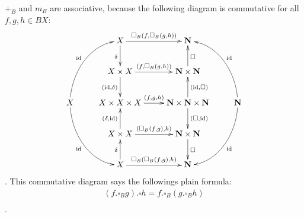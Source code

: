 $+_B$ and $m_B$ are associative, because the following diagram is commutative
for all $f,g,h\in BX$:
\begin{equation}\xymatrix{
	& X \ar[r]^{\square_B\kakko{f,\square_B\kakko{g, h}}} \ar[d]_{\delta} 
	& \mybf{N}
	\\
	& X\times X \ar[r]^{\kakko{f,\square_B\kakko{g, h}}} \ar[d]_{(\myid,\delta)}
	& \mybf{N}\times \mybf{N} \ar[u]_{\square}
	\\
	X \ar@(u,l)[ruu]^{\myid} \ar@(d,l)[rdd]_{\myid}
	& X\times X\times X \ar[r]^{(f, g, h)}
	& \mybf{N}\times \mybf{N}\times \mybf{N} \ar[d]^{(\square, \myid)} \ar[u]_{(\myid, \square)}
	& \mybf{N} \ar@(u,r)[luu]_{\myid} \ar@(d,r)[ldd]^{\myid}
	\\
	& X\times X \ar[r]^{\kakko{\square_B\kakko{f, g},h}} \ar[u]^{(\delta,\myid)}
	& \mybf{N}\times \mybf{N} \ar[d]^{\square}
	\\
	& X \ar[r]^{\square_B\kakko{\square_B\kakko{f, g},h}} \ar[u]^{\delta}
	& \mybf{N} 
	\\
}\end{equation}
. This commutative diagram says the followings plain formula:
\begin{equation}\begin{split}
	(f.\square_Bg).\square h = f.\square_B(g.\square_Bh) \\
\end{split}\end{equation}
.

